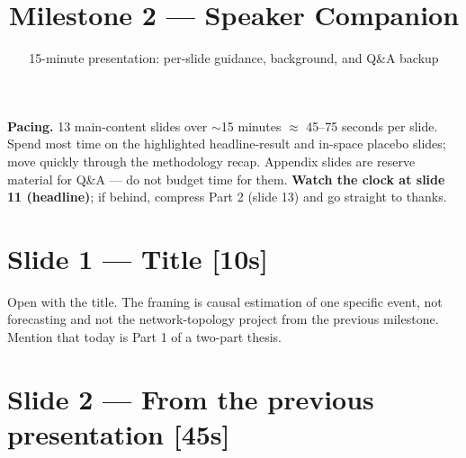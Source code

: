 \documentclass[11pt,a4paper]{article}
\title{\bfseries Milestone 2 --- Speaker Companion}
\author{15-minute presentation: per-slide guidance, background, and Q\&A backup}
\date{}
\newcommand{\timetag}[1]{\hfill\textcolor{muted}{\small[#1]}}
\begin{document}
\maketitle
\vspace{-2em}

\begin{tcolorbox}[colback=lightbg,colframe=accent!40,arc=2pt]
\textbf{Pacing.} 13 main-content slides over $\sim$15 minutes $\approx$ 45--75 seconds per slide. Spend most time on the highlighted headline-result and in-space placebo slides; move quickly through the methodology recap. Appendix slides are reserve material for Q\&A --- do not budget time for them. \textbf{Watch the clock at slide 11 (headline)}; if behind, compress Part 2 (slide 13) and go straight to thanks.
\end{tcolorbox}

\section{Slide 1 --- Title \timetag{10s}}

Open with the title. The framing is causal estimation of one specific event, not forecasting and not the network-topology project from the previous milestone. Mention that today is Part 1 of a two-part thesis.

\section{Slide 2 --- From the previous presentation \timetag{45s}}
\end{document}
